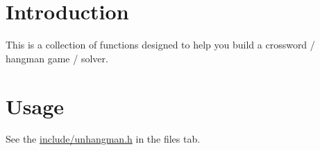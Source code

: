\hypertarget{index_intro_sec}{}\section{Introduction}\label{index_intro_sec}
This is a collection of functions designed to help you build a crossword / hangman game / solver.\hypertarget{index_usage}{}\section{Usage}\label{index_usage}
See the \hyperlink{unhangman_8h}{include/unhangman.\+h} in the files tab. 